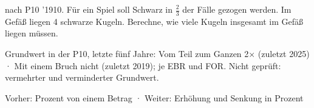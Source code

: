 \documentclass[11pt]{article}
\let\gkopf\empty
\newcommand{\gueber}[1]{\gdef\gkopf{#1}}
\begin{document}
\par\addvspace{6pt}\gueber{\vspace{10pt}{\large\bfseries Mit einem Bruch}\par\vspace{2pt}}
\begin{pfaufg}{nach P10 ’19}{10.}{}
Für ein Spiel soll Schwarz in $\tfrac{2}{3}$ der Fälle gezogen werden. Im Gefäß liegen 4 schwarze Kugeln. Berechne, wie viele Kugeln insgesamt im Gefäß liegen müssen.
\end{pfaufg}
\par\vfill\noindent\begin{minipage}{\linewidth}{\footnotesize\color{black!70}Grundwert in der P10, letzte fünf Jahre: Vom Teil zum Ganzen 2× (zuletzt 2025) · Mit einem Bruch nicht (zuletzt 2019); je EBR und FOR. Nicht geprüft: vermehrter und verminderter Grundwert.\par\noindent Vorher: Prozent von einem Betrag · Weiter: Erhöhung und Senkung in Prozent\par}\end{minipage}
\end{document}
